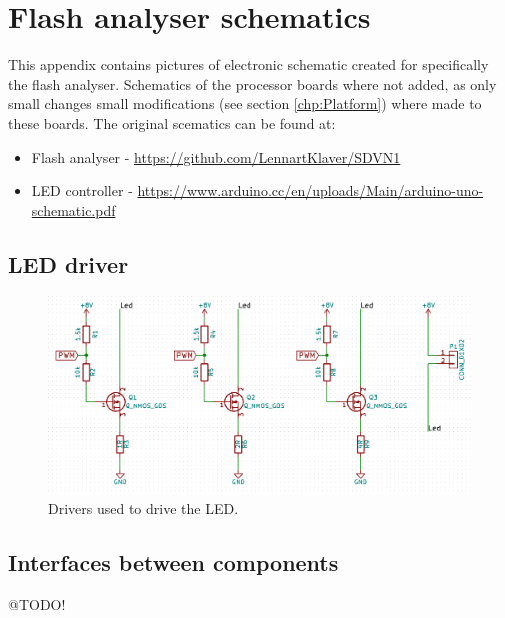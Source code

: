 \chapter{Flash analyser schematics}
\label{app_schematics}
This appendix contains pictures of electronic schematic created for specifically the flash analyser. Schematics of the processor boards where not added, as only small changes small modifications (see section \ref{chp:Platform}) where made to these boards. The original scematics can be found at:
\begin{itemize}
    \item Flash analyser - \url{https://github.com/LennartKlaver/SDVN1} 
    \item LED controller - \url{https://www.arduino.cc/en/uploads/Main/arduino-uno-schematic.pdf}
\end{itemize}


\section{LED driver}
\begin{figure}[!h]
	\includegraphics[width=\textwidth]{pics/LED_Driver.png}
	\caption{Drivers used to drive the LED.}
	\label{fig:LED_Driver}
\end{figure}

\section{Interfaces between components}
@TODO!